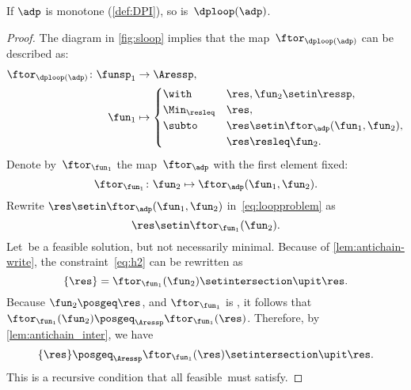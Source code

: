 \begin{proposition}
    \label{prop:loop-continuous}
    If $\adp$ is monotone (\cref{def:DPI}),
    so is~$\dploop(\adp)$.
\end{proposition}
\begin{proof}
    The diagram in \cref{fig:sloop} implies that the map~$\ftor_{\dploop(\adp)}$
    can be described as:
    \begin{align}
        \ftor_{\dploop(\adp)}\colon\funsp_{1} & \to\Aressp,\label{eq:loopproblem} \\
        \fun_{1}                              & \mapsto\begin{cases}
                                                           \with          & \res,\fun_{2}\setin\ressp,                 \\
                                                           \Min_{\resleq} & \res,                                      \\
                                                           \subto         & \res\setin\ftor_{\adp}(\fun_{1},\fun_{2}), \\
                                                                          & \res\resleq\fun_{2}.
                                                       \end{cases}
    \end{align}
    Denote by~$\ftor_{\fun_{1}}$ the map~$\ftor_{\adp}$ with the first element fixed:
    \begin{equation*}
        \ftor_{\fun_{1}}\colon\fun_{2}\mapsto\ftor_{\adp}(\fun_{1},\fun_{2}).
    \end{equation*}
    Rewrite $\res\setin\ftor_{\adp}(\fun_{1},\fun_{2})$ in~\cref{eq:loopproblem} as
    \begin{equation}
        \res\setin\ftor_{\fun_{1}}(\fun_{2}).
        \label{eq:h2}
    \end{equation}
    Let~\res be a feasible solution, but not necessarily minimal.
    Because of \cref{lem:antichain-write}, the constraint~\cref{eq:h2} can be rewritten as
    \begin{equation}
        \{\res\}=\ftor_{\fun_{1}}(\fun_{2})\setintersection\upit\res.
        \label{eq:h3}
    \end{equation}
    Because $\fun_{2}\posgeq\res$, and $\ftor_{\fun_{1}}$ is \scottcontinuous, it follows that~$\ftor_{\fun_{1}}(\fun_{2})\posgeq_{\Aressp}\ftor_{\fun_{1}}(\res)$.
    Therefore, by \cref{lem:antichain_inter}, we have
    \begin{equation}
        \{\res\}\posgeq_{\Aressp}\ftor_{\fun_{1}}(\res)\setintersection\upit\res.
        \label{eq:fea}
    \end{equation}
    This is a recursive condition that all feasible~\res must satisfy.


\end{proof}

